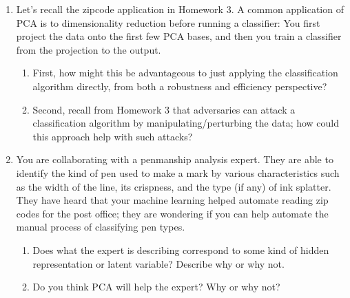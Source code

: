 \documentclass[submit]{../harvardml}
\begin{document}
\begin{problem}
\begin{enumerate}
    \item Let's recall the zipcode application in Homework 3.  A common
    application of PCA is to dimensionality reduction before running a
    classifier: You first project the data onto the first few PCA bases,
    and then you train a classifier from the projection to the output.
    \begin{enumerate}
      \item First, how might this be advantageous to just applying the classification algorithm directly, from both a robustness and efficiency perspective? 
      
      \item Second, recall from Homework 3 that adversaries can attack a classification algorithm by manipulating/perturbing the data; how could this approach help with such attacks?
    \end{enumerate}

    \item You are collaborating with a penmanship analysis expert.  They
    are able to identify the kind of pen used to make a mark by various
    characteristics such as the width of the line, its crispness, and
    the type (if any) of ink splatter.  They have heard that your
    machine learning helped automate reading zip codes for the post
    office; they are wondering if you can help automate the manual
    process of classifying pen types.
    \begin{enumerate}

      \item Does what the expert is describing correspond to some kind
      of hidden representation or latent variable?  Describe why or
      why not.
      
      \item Do you think PCA will help the expert?  Why or why not?
    \end{enumerate}
  \end{enumerate}
\end{problem}

\newpage
\end{document}
